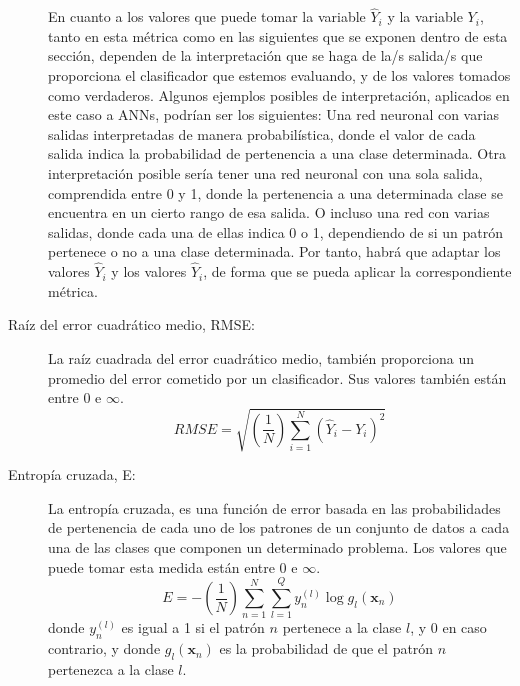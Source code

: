 \begin{description}
	En cuanto a los valores que puede tomar la variable $\hat{Y}_{i}$ y
	la variable $Y_{i}$, tanto en esta métrica como en las siguientes que se
	exponen dentro de esta sección, dependen de la interpretación que se haga de la/s
	salida/s que proporciona el clasificador que	estemos evaluando, y de los valores
	tomados como	verdaderos. Algunos ejemplos posibles de interpretación, aplicados en
	este	caso a ANNs, podrían ser los	siguientes: Una red
	neuronal	con varias salidas interpretadas de manera probabilística, donde el valor de
	cada salida indica la probabilidad de pertenencia a una clase determinada. Otra
	interpretación posible sería tener una red neuronal con una sola salida, comprendida
	entre 0 y 1, donde la pertenencia a una determinada clase se encuentra en un cierto
	rango	de esa salida. O incluso una red con varias salidas, donde cada una de ellas
	indica 0 o 1, dependiendo de si un patrón pertenece o no a una clase determinada. Por tanto,
	habrá
	que adaptar los valores $\hat{Y}_{i}$ y los valores $\hat{Y}_{i}$, de forma que se
	pueda aplicar la correspondiente métrica.
	\item[Raíz del error cuadrático medio, RMSE:] La raíz
	cuadrada	del error cuadrático
	medio, también proporciona un promedio del error cometido por un clasificador. Sus
	valores también están entre 0 e $\infty$.
	\begin{displaymath}
	RMSE=\sqrt{\left(\frac{1}{N}\right)\sum_{i=1}^N\left(\hat{Y}_{i}
	-Y_{i}\right)^2}
	\end{displaymath}
	\item[Entropía cruzada, E:] La entropía cruzada, es una función
	de error basada en
	las probabilidades de pertenencia de cada uno de los patrones de un conjunto de datos a
	cada una de las clases que componen un determinado problema. Los valores que puede
	tomar esta medida están	entre 0 e $\infty$.
	\begin{displaymath}
	E=-\left(\frac{1}{N}\right)\sum_{n=1}^N\sum_{l=1}^Qy_{n}^{(l)}\log
	g_{l}^{}(\mathbf{x}_{n})
	\end{displaymath}
	donde $y_{n}^{(l)}$ es igual a 1 si el patrón $n$ pertenece a la clase $l$, y 0 en caso
	contrario, y donde  $\displaystyle g_{l}^{}(\mathbf{x}_{n})$ es la probabilidad de que
	el patrón $n$ 	pertenezca a la clase $l$.

\end{description}
